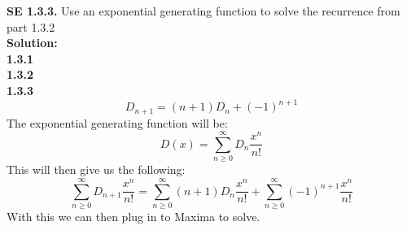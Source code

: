 \documentclass[10pt,a4paper]{report}
\begin{document}
	\textbf{SE 1.3.3.} Use an exponential generating function to solve the recurrence from part 1.3.2\\
	\newline
	\textbf{Solution: }\\
	\newline
	\textbf{1.3.1}\\
	\newline
	\textbf{1.3.2}\\
	\newline
	\textbf{1.3.3}\\
	\[D_{n+1} = (n+1)D_n + (-1)^{n+1}\]
	The exponential generating function will be:\\
	\[D(x) = \sum_{n\geq0}^{\infty}D_n\frac{x^n}{n!}\]
	This will then give us the following:
	\[\sum_{n\geq0}^{\infty}D_{n+1}\frac{x^n}{n!} = \sum_{n\geq0}^{\infty}(n+1)D_n\frac{x^n}{n!} + \sum_{n\geq0}^{\infty}(-1)^{n+1}\frac{x^n}{n!} \]
	With this we can then plug in to Maxima to solve.\\
	\newline
\end{document}
